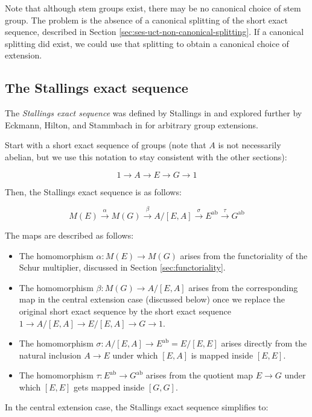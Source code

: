 Note that although stem groups exist, there may be no canonical choice
of stem group. The problem is the absence of a canonical splitting of
the short exact sequence, described in Section
\ref{sec:ses-uct-non-canonical-splitting}. If a canonical splitting
did exist, we could use that splitting to obtain a canonical choice of
extension.

\subsection{The Stallings exact sequence}

The {\em Stallings exact sequence} was defined by Stallings in
\cite{Stallings} and explored further by Eckmann, Hilton, and
Stammbach in \cite{EckmannHiltonStammbach} for arbitrary group
extensions.

Start with a short exact sequence of groups (note that $A$ is not
necessarily abelian, but we use this notation to stay consistent with
the other sections):

$$1 \to A \to E \to G \to 1$$

Then, the Stallings exact sequence is as follows:

$$M(E) \stackrel{\alpha}{\to} M(G) \stackrel{\beta}{\to} A/[E,A] \stackrel{\sigma}{\to} E^{\operatorname{ab}} \stackrel{\tau}{\to} G^{\operatorname{ab}}$$

The maps are described as follows:

\begin{itemize}
\item The homomorphism $\alpha:M(E) \to M(G)$ arises from the
  functoriality of the Schur multiplier, discussed in Section
  \ref{sec:functoriality}.
\item The homomorphism $\beta:M(G) \to A/[E,A]$ arises from the
  corresponding map in the central extension case (discussed below)
  once we replace the original short exact sequence by the short exact
  sequence $1 \to A/[E,A] \to E/[E,A] \to G \to 1$.
\item The homomorphism $\sigma:A/[E,A] \to E^{\operatorname{ab}} =
  E/[E,E]$ arises directly from the natural inclusion $A \to E$ under
  which $[E,A]$ is mapped inside $[E,E]$.
\item The homomorphism $\tau:E^{\operatorname{ab}} \to
  G^{\operatorname{ab}}$ arises from the quotient map $E \to G$ under
  which $[E,E]$ gets mapped inside $[G,G]$.
\end{itemize}

In the central extension case, the Stallings exact sequence simplifies to:


